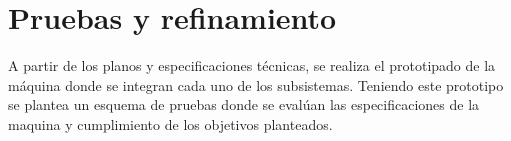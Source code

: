 \section{Pruebas y refinamiento}
A partir de los planos y especificaciones técnicas, se realiza el prototipado de la máquina donde se integran cada uno de los subsistemas. Teniendo este prototipo se plantea un esquema de pruebas donde se evalúan las especificaciones de la maquina y cumplimiento de los objetivos planteados.



\chapterend{}
